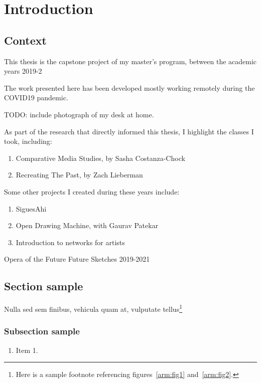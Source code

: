 \chapter{Introduction}

\section{Context}

This thesis is the capstone project of my master's program, between the academic years 2019-2

The work presented here has been developed mostly working remotely during the COVID19 pandemic.

TODO: include photograph of my desk at home.

As part of the research that directly informed this thesis, I highlight the classes I took,
including:

\begin{enumerate}
        \item Comparative Media Studies, by Sasha Costanza-Chock
        \item Recreating The Past, by Zach Lieberman
\end{enumerate}

Some other projects I created during these years include:

\begin{enumerate}
        \item SiguesAhi
        \item Open Drawing Machine, with Gaurav Patekar
        \item Introduction to networks for artists
\end{enumerate}

\cite[John Maeda, 2001]{design-by-numbers}

Opera of the Future
Future Sketches
2019-2021

\section{Section sample}\label{ch1:sec}

Nulla sed sem finibus, vehicula quam at, vulputate tellus\footnote{Here is a sample footnote referencing figures~\ref{arm:fig1}
and~\ref{arm:fig2}.}  

\subsection{Subsection sample}

\begin{enumerate}
  \item Item 1.
\end{enumerate}
